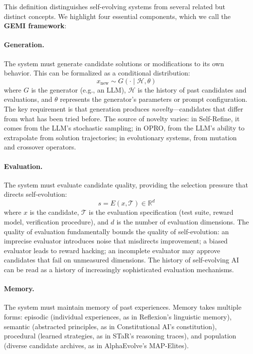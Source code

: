 This definition distinguishes self-evolving systems from several related but distinct concepts. We highlight four essential components, which we call the \textbf{GEMI framework}:

\paragraph{Generation.}
The system must generate candidate solutions or modifications to its own behavior. This can be formalized as a conditional distribution:
\begin{equation}
    x_{\text{new}} \sim G(\cdot \mid \mathcal{H}, \theta)
\end{equation}
where $G$ is the generator (e.g., an LLM), $\mathcal{H}$ is the history of past candidates and evaluations, and $\theta$ represents the generator's parameters or prompt configuration. The key requirement is that generation produces \emph{novelty}---candidates that differ from what has been tried before. The source of novelty varies: in Self-Refine, it comes from the LLM's stochastic sampling; in OPRO, from the LLM's ability to extrapolate from solution trajectories; in evolutionary systems, from mutation and crossover operators.

\paragraph{Evaluation.}
The system must evaluate candidate quality, providing the selection pressure that directs self-evolution:
\begin{equation}
    s = E(x, \mathcal{T}) \in \mathbb{R}^d
\end{equation}
where $x$ is the candidate, $\mathcal{T}$ is the evaluation specification (test suite, reward model, verification procedure), and $d$ is the number of evaluation dimensions. The quality of evaluation fundamentally bounds the quality of self-evolution: an imprecise evaluator introduces noise that misdirects improvement; a biased evaluator leads to reward hacking; an incomplete evaluator may approve candidates that fail on unmeasured dimensions. The history of self-evolving AI can be read as a history of increasingly sophisticated evaluation mechanisms.

\paragraph{Memory.}
The system must maintain memory of past experiences. Memory takes multiple forms: episodic (individual experiences, as in Reflexion's linguistic memory), semantic (abstracted principles, as in Constitutional AI's constitution), procedural (learned strategies, as in STaR's reasoning traces), and population (diverse candidate archives, as in AlphaEvolve's MAP-Elites).

